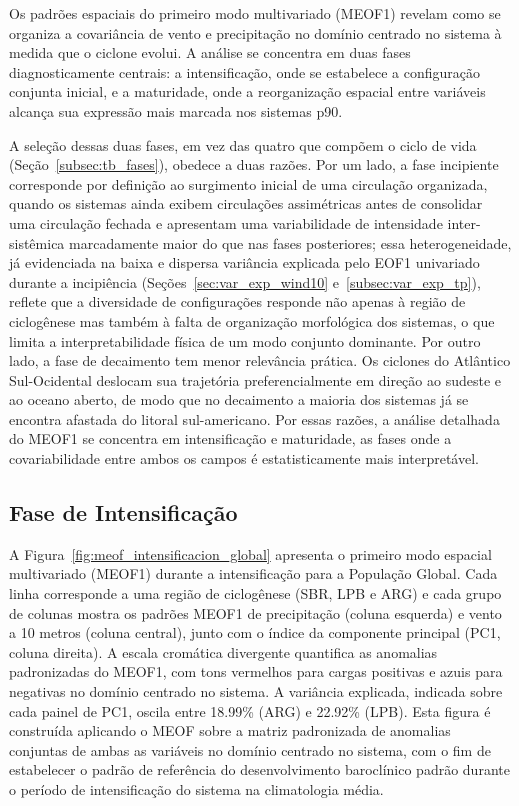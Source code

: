 Os padrões espaciais do primeiro modo multivariado (MEOF1) revelam como se organiza a covariância de vento e precipitação no domínio centrado no sistema à medida que o ciclone evolui.
A análise se concentra em duas fases diagnosticamente centrais: a intensificação, onde se estabelece a configuração conjunta inicial, e a maturidade, onde a reorganização espacial entre variáveis alcança sua expressão mais marcada nos sistemas p90.

A seleção dessas duas fases, em vez das quatro que compõem o ciclo de vida (Seção~\ref{subsec:tb_fases}), obedece a duas razões.
Por um lado, a fase incipiente corresponde por definição ao surgimento inicial de uma circulação organizada, quando os sistemas ainda exibem circulações assimétricas antes de consolidar uma circulação fechada e apresentam uma variabilidade de intensidade inter-sistêmica marcadamente maior do que nas fases posteriores; essa heterogeneidade, já evidenciada na baixa e dispersa variância explicada pelo EOF1 univariado durante a incipiência (Seções~\ref{sec:var_exp_wind10} e~\ref{subsec:var_exp_tp}), reflete que a diversidade de configurações responde não apenas à região de ciclogênese mas também à falta de organização morfológica dos sistemas, o que limita a interpretabilidade física de um modo conjunto dominante.
Por outro lado, a fase de decaimento tem menor relevância prática. Os ciclones do Atlântico Sul-Ocidental deslocam sua trajetória preferencialmente em direção ao sudeste e ao oceano aberto, de modo que no decaimento a maioria dos sistemas já se encontra afastada do litoral sul-americano.
Por essas razões, a análise detalhada do MEOF1 se concentra em intensificação e maturidade, as fases onde a covariabilidade entre ambos os campos é estatisticamente mais interpretável.

\subsection{Fase de Intensificação}
\label{subsec:meof_intensificacion}

A Figura~\ref{fig:meof_intensificacion_global} apresenta o primeiro modo espacial multivariado (MEOF1) durante a intensificação para a População Global.
Cada linha corresponde a uma região de ciclogênese (SBR, LPB e ARG) e cada grupo de colunas mostra os padrões MEOF1 de precipitação (coluna esquerda) e vento a 10 metros (coluna central), junto com o índice da componente principal (PC1, coluna direita).
A escala cromática divergente quantifica as anomalias padronizadas do MEOF1, com tons vermelhos para cargas positivas e azuis para negativas no domínio centrado no sistema. A variância explicada, indicada sobre cada painel de PC1, oscila entre 18.99\% (ARG) e 22.92\% (LPB).
Esta figura é construída aplicando o MEOF sobre a matriz padronizada de anomalias conjuntas de ambas as variáveis no domínio centrado no sistema, com o fim de estabelecer o padrão de referência do desenvolvimento baroclínico padrão durante o período de intensificação do sistema na climatologia média.

